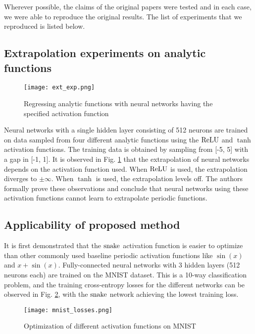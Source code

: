 Wherever possible, the claims of the original papers were tested and in each case, we were able to reproduce the original results. The list of experiments that we reproduced is listed below.

\subsection{Extrapolation experiments on analytic functions}

\begin{figure}[h]

\centering
\texttt{[image: ext\_exp.png]}
\caption{Regressing analytic functions with neural networks having the specified activation function}
\label{fig:extrapolation}
\end{figure}

Neural networks with a single hidden layer consisting of 512 neurons are trained on data sampled from four different analytic functions using the $ \operatorname{ReLU} $ and $ \tanh $ activation functions. The training data is obtained by sampling from [-5, 5] with a gap in [-1, 1]. It is observed in Fig. \ref{fig:extrapolation} that the extrapolation of neural networks depends on the activation function used. When $ \operatorname{ReLU} $ is used, the extrapolation diverges to $\pm \infty$. When $ \tanh $ is used, the extrapolation levels off. The authors formally prove these observations and conclude that neural networks using these activation functions cannot learn to extrapolate periodic functions.

\subsection{Applicability of proposed method}
It is first demonstrated that the $ \operatorname{snake} $ activation function is easier to optimize than other commonly used baseline periodic activation functions like $\sin(x)$ and $x + \sin(x)$. Fully-connected neural networks with 3 hidden layers (512 neurons each) are trained on the MNIST dataset. This is a 10-way classification problem, and the training cross-entropy losses for the different networks can be observed in Fig. {\ref{fig:mnist_loss}}, with the $ \operatorname{snake} $ network achieving the lowest training loss. \\

\begin{figure}[h]
\centering
\texttt{[image: mnist\_losses.png]}
\caption{Optimization of different activation functions on MNIST}
\label{fig:mnist_loss}
\end{figure}


